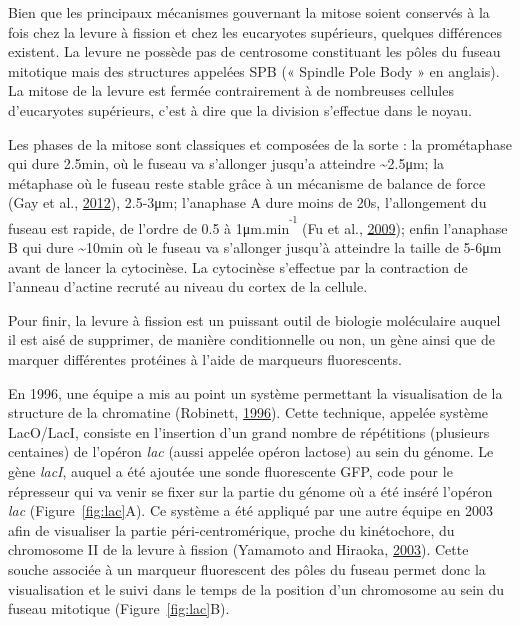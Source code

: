 \documentclass[12pt,a4paper,twoside,openright]{book}
\begin{document}
Bien que les principaux mécanismes gouvernant la mitose soient conservés
à la fois chez la levure à fission et chez les eucaryotes supérieurs,
quelques différences existent. La levure ne possède pas de centrosome
constituant les pôles du fuseau mitotique mais des structures appelées
SPB (« Spindle Pole Body » en anglais). La mitose de la levure est
fermée contrairement à de nombreuses cellules d'eucaryotes supérieurs,
c'est à dire que la division s'effectue dans le noyau.

Les phases de la mitose sont classiques et composées de la sorte : la
prométaphase qui dure 2.5min, où le fuseau va s'allonger jusqu'a
atteindre \textasciitilde{}2.5μm; la métaphase où le fuseau reste stable
grâce à un mécanisme de balance de force (Gay et al.,
\hyperref[ref-Gay2012a]{2012}), 2.5-3μm; l'anaphase A dure moins de 20s,
l'allongement du fuseau est rapide, de l'ordre de 0.5 à
1μm.min\textsuperscript{\textsuperscript{-1}} (Fu et al.,
\hyperref[ref-Fu2009]{2009}); enfin l'anaphase B qui dure
\textasciitilde{}10min où le fuseau va s'allonger jusqu'à atteindre la
taille de 5-6μm avant de lancer la cytocinèse. La cytocinèse s'effectue
par la contraction de l'anneau d'actine recruté au niveau du cortex de
la cellule.

Pour finir, la levure à fission est un puissant outil de biologie
moléculaire auquel il est aisé de supprimer, de manière conditionnelle
ou non, un gène ainsi que de marquer différentes protéines à l'aide de
marqueurs fluorescents.

En 1996, une équipe a mis au point un système permettant la
visualisation de la structure de la chromatine (Robinett,
\hyperref[ref-Robinett1996]{1996}). Cette technique, appelée système
LacO/LacI, consiste en l'insertion d'un grand nombre de répétitions
(plusieurs centaines) de l'opéron \emph{lac} (aussi appelée opéron
lactose) au sein du génome. Le gène \emph{lacI}, auquel a été ajoutée
une sonde fluorescente GFP, code pour le répresseur qui va venir se
fixer sur la partie du génome où a été inséré l'opéron \emph{lac}
(Figure~\ref{fig:lac}A). Ce système a été appliqué par une autre équipe
en 2003 afin de visualiser la partie péri-centromérique, proche du
kinétochore, du chromosome II de la levure à fission (Yamamoto and
Hiraoka, \hyperref[ref-Yamamoto2003]{2003}). Cette souche associée à un
marqueur fluorescent des pôles du fuseau permet donc la visualisation et
le suivi dans le temps de la position d'un chromosome au sein du fuseau
mitotique (Figure~\ref{fig:lac}B).
\end{document}
